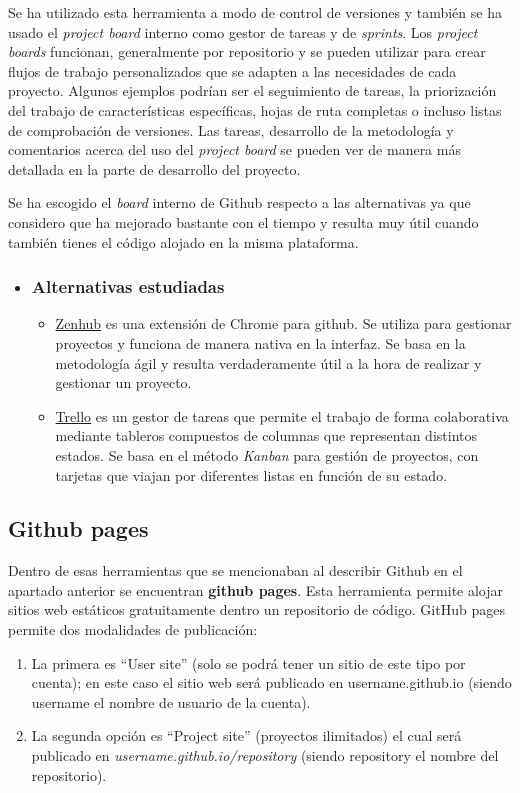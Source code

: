 Se ha utilizado esta herramienta a modo de control de versiones y también se ha usado el \textit{project board} interno como gestor de tareas y de \textit{sprints}. Los \textit{project boards} funcionan, generalmente por repositorio y se pueden utilizar para crear flujos de trabajo personalizados que se adapten a las necesidades de cada proyecto. Algunos ejemplos podrían ser el seguimiento de tareas, la priorización del trabajo de características específicas, hojas de ruta completas o incluso listas de comprobación de versiones. Las tareas, desarrollo de la metodología y comentarios acerca del uso del \textit{project board} se pueden ver de manera más detallada en la parte de desarrollo del proyecto.

Se ha escogido el \textit{board} interno de Github respecto a las alternativas ya que considero que ha mejorado bastante con el tiempo y resulta muy útil cuando también tienes el código alojado en la misma plataforma.

\begin{itemize}
	\item \subsubsection{Alternativas estudiadas}
	\begin{itemize}
		\item \href{https://www.zenhub.io/}{Zenhub} es una extensión de Chrome para github. Se utiliza para gestionar proyectos y funciona de manera nativa en la interfaz. Se basa en la metodología ágil y resulta verdaderamente útil a la hora de realizar y gestionar un proyecto.
		\item \href{https://www.trello.com/}{Trello} es un gestor de tareas que permite el trabajo de forma colaborativa mediante tableros compuestos de columnas  que representan distintos estados. Se basa en el método \textit{Kanban} para gestión de proyectos, con tarjetas que viajan por diferentes listas en función de su estado. 
	\end{itemize}
\end{itemize}

\subsection{Github pages}
Dentro de esas herramientas que se mencionaban al describir Github en el apartado anterior se encuentran \textbf{github pages}. Esta herramienta permite alojar sitios web estáticos gratuitamente dentro un repositorio de código. GitHub pages permite dos modalidades de publicación:
\begin{enumerate}
	\item La primera es “User site” (solo se podrá tener un sitio de este tipo por cuenta); en este caso el sitio web será publicado en username.github.io (siendo username el nombre de usuario de la cuenta).
	\item La segunda opción es “Project site” (proyectos ilimitados) el cual será publicado en \textit{username.github.io/repository} (siendo repository el nombre del repositorio).
\end{enumerate}

